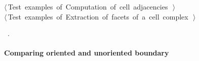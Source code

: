 \documentclass[11pt,oneside]{article}	%
\begin{document}
\begin{flushleft}
\begin{list}{}{}
\mbox{}\verb@@\hbox{$\langle\,$Test examples of Computation of cell adjacencies\nobreak\ {\footnotesize {}}$\,\rangle$}\verb@@\\
\mbox{}\verb@@\hbox{$\langle\,$Test examples of Extraction of facets of a cell complex\nobreak\ {\footnotesize {}}$\,\rangle$}\verb@@\\
\mbox{}\verb@@{\NWsep}
\end{list}
\vspace{-1ex}
\footnotesize\addtolength{\baselineskip}{-1ex}
\begin{list}{}{\setlength{\itemsep}{-\parsep}\setlength{\itemindent}{-\leftmargin}}
\item \NWtxtMacroRefIn\ .
\end{list}
\end{flushleft}

\paragraph{Comparing oriented and unoriented boundary}
\end{document}
